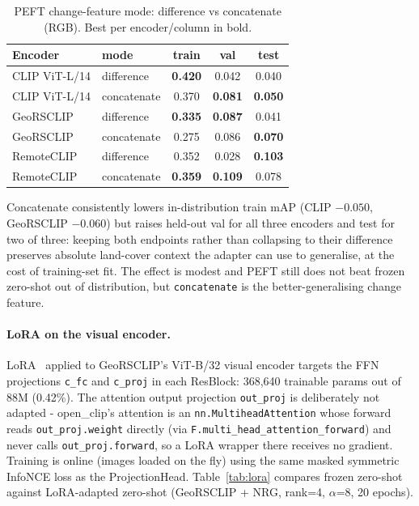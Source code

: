 \documentclass{article}
\begin{document}
\begin{table}[H]
    \centering
    \caption{PEFT change-feature mode: difference vs concatenate (RGB).
    Best per encoder/column in bold.}
    \label{tab:concat}
    \begin{tabular}{llccc}
        \toprule
        \textbf{Encoder} & \textbf{mode} & \textbf{train} & \textbf{val} & \textbf{test} \\
        \midrule
        CLIP ViT-L/14 & difference  & \textbf{0.420} & 0.042 & 0.040 \\
        CLIP ViT-L/14 & concatenate & 0.370 & \textbf{0.081} & \textbf{0.050} \\
        GeoRSCLIP     & difference  & \textbf{0.335} & \textbf{0.087} & 0.041 \\
        GeoRSCLIP     & concatenate & 0.275 & 0.086 & \textbf{0.070} \\
        RemoteCLIP    & difference  & 0.352 & 0.028 & \textbf{0.103} \\
        RemoteCLIP    & concatenate & \textbf{0.359} & \textbf{0.109} & 0.078 \\
        \bottomrule
    \end{tabular}
\end{table}

Concatenate consistently lowers in-distribution train mAP (CLIP $-0.050$,
GeoRSCLIP $-0.060$) but raises held-out val for all three encoders and test for
two of three: keeping both endpoints rather than collapsing to their difference
preserves absolute land-cover context the adapter can use to generalise, at the
cost of training-set fit. The effect is modest and PEFT still does not beat
frozen zero-shot out of distribution, but \texttt{concatenate} is the
better-generalising change feature.

\paragraph{LoRA on the visual encoder.}
LoRA~\cite{lora} applied to GeoRSCLIP's ViT-B/32 visual encoder targets the FFN
projections \texttt{c\_fc} and \texttt{c\_proj} in each ResBlock: 368{,}640
trainable params out of 88M (0.42\%). The attention output projection
\texttt{out\_proj} is deliberately not adapted - open\_clip's attention is an
\texttt{nn.\allowbreak{}MultiheadAttention} whose forward reads \texttt{out\_proj.weight}
directly (via \texttt{F.\allowbreak{}multi\_\allowbreak{}head\_\allowbreak{}attention\_\allowbreak{}forward}) and never calls
\texttt{out\_proj.forward}, so a LoRA wrapper there receives no gradient.
Training is online (images loaded on the fly) using the same masked symmetric
InfoNCE loss as the ProjectionHead. Table~\ref{tab:lora} compares frozen
zero-shot against LoRA-adapted zero-shot (GeoRSCLIP + NRG, rank=4, $\alpha$=8, 20
epochs).
\end{document}
